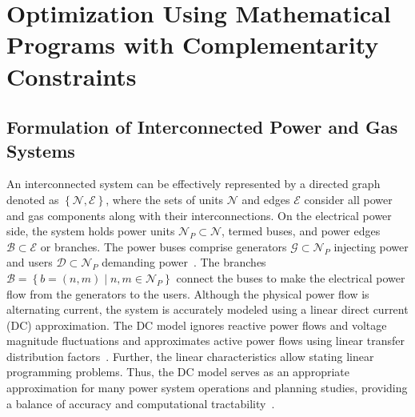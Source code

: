 \chapter{Optimization Using Mathematical Programs with Complementarity Constraints} \label{cap:optimization_mpcc}

\section{Formulation of Interconnected Power and Gas Systems} \label{sec:formulation}


An interconnected system can be effectively represented by a directed graph denoted as $\left\lbrace\mathcal{N}, \mathcal{E}\right\rbrace$, where the sets of units $\mathcal{N}$ and edges $\mathcal{E}$ consider all power and gas components along with their interconnections. On the electrical power side, the system holds power units $\mathcal{N}_P\subset\mathcal{N}$, termed buses, and power edges $\mathcal{B}\subset\mathcal{E}$ or branches. The power buses comprise generators $\mathcal{G}\subset\mathcal{N}_P$ injecting power and users $\mathcal{D}\subset\mathcal{N}_P$ demanding power~\cite{WANG2019113410}. The branches $\mathcal{B} = \left\{b=(n,m) \mid n,m\in\mathcal{N}_P \right\}$ connect the buses to make the electrical power flow from the generators to the users. Although the physical power flow is alternating current, the system is accurately modeled using a linear direct current (DC) approximation. The DC model ignores reactive power flows and voltage magnitude fluctuations and approximates active power flows using linear transfer distribution factors~\cite{DC_flow}. Further, the linear characteristics allow stating linear programming problems. Thus, the DC model serves as an appropriate approximation for many power system operations and planning studies, providing a balance of accuracy and computational tractability~\cite{DC_flow2}. 


